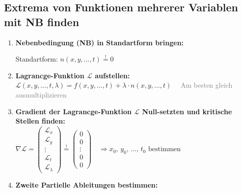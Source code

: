 \subsection{Extrema von Funktionen mehrerer Variablen mit NB finden}

\begin{enumerate}[itemsep=1ex]
    \item \textbf{Nebenbedingung (NB) in Standartform bringen:}\\
    \begin{minipage}[t]{0.4\columnwidth}
        Standartform: $n(x, y, ... , t) \stackrel{!}{=} 0$
    \end{minipage}\hfill
    \begin{minipage}[t]{0.6\columnwidth}
    \end{minipage}


    \item \textbf{Lagrancge-Funktion $\mathcal{L}$ aufstellen:}\\
    $\mathcal{L}(x, y, ..., t, \lambda) =
    f(x, y, ..., t) + \lambda \cdot n(x, y, ..., t) \,\,\,\,\,\,$ \textcolor{gray}{Am besten gleich ausmultiplizieren}
    

    \item \textbf{Gradient der Lagrancge-Funktion $\mathcal{L}$ Null-setzten und kritische Stellen finden:}\\
    $\nabla \mathcal{L}=
    \begin{pmatrix}
        \mathcal{L}_x\\
        \mathcal{L}_y\\
        \vdots \\
        \mathcal{L}_t\\
        \mathcal{L}_\lambda
    \end{pmatrix} \stackrel{!}{=}
    \begin{pmatrix}
        0\\
        0\\
        \vdots \\
        0\\
        0
    \end{pmatrix}
    \, \, \, \, \, \,
    \Rightarrow 
    x_0 \text{, } y_0 \text{, }... \text{, } t_0 \text{ bestimmen}$\\

    \item \textbf{Zweite Partielle Ableitungen bestimmen:}\\
    


\end{enumerate}
